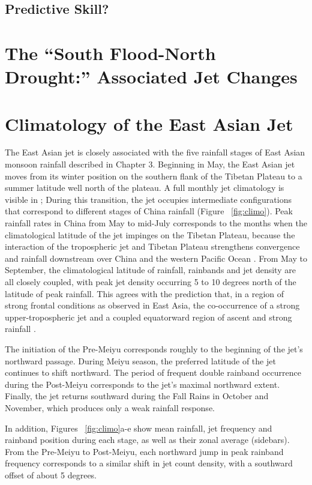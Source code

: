 \subsection{Predictive Skill?}

\section{The ``South Flood-North Drought:'' Associated Jet Changes}

\section{Climatology of the East Asian Jet}

	The East Asian jet is closely associated with the five rainfall stages of East Asian monsoon rainfall described in Chapter 3. Beginning in May, the East Asian jet moves from its winter position on the southern flank of the Tibetan Plateau to a summer latitude well north of the plateau.  A full monthly jet climatology is visible in \citet{Schiemann2009}; During this transition, the jet occupies intermediate configurations that correspond to different stages of China rainfall (Figure ~\ref{fig:climo}). Peak rainfall rates in China from May to mid-July corresponds to the months when the climatological latitude of the jet impinges on the Tibetan Plateau, because the interaction of the tropospheric jet and Tibetan Plateau strengthens convergence and rainfall downstream over China and the western Pacific Ocean \citep{Molnar2010,Sampe2010,Chen2014}. From May to September,  the climatological latitude of rainfall, rainbands and jet density are all closely coupled, with peak jet density occurring 5 to 10 degrees north of the latitude of peak rainfall. This agrees with the prediction that, in a region of strong frontal conditions as observed in East Asia, the co-occurrence of a strong upper-tropospheric jet and a coupled equatorward region of ascent and strong rainfall \citep{Holton2004}. 
	
	The initiation of the Pre-Meiyu corresponds roughly to the beginning of the jet's northward passage. During Meiyu season, the preferred latitude of the jet continues to shift northward. The period of frequent double rainband occurrence during the Post-Meiyu corresponds to the jet's maximal northward extent. Finally, the jet returns southward during the Fall Rains in October and November, which produces only a weak rainfall response.
	
	In addition, Figures ~\ref{fig:climo}a-e show mean rainfall, jet frequency and rainband position during each stage, as well as their zonal average (sidebars). From the Pre-Meiyu to Post-Meiyu, each northward jump in peak rainband frequency corresponds to a similar shift in jet count density, with a southward offset of about 5 degrees.
	
